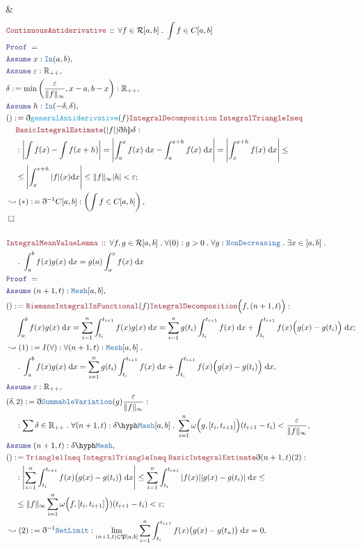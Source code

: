 \documentclass[12pt]{scrartcl}
\newcommand{\TYPE}[1]{\textcolor{NavyBlue}{\mathtt{#1}}}
\newcommand{\FUNC}[1]{\textcolor{Cerulean}{\mathtt{#1}}}
\newcommand{\LOGIC}[1]{\textcolor{Blue}{\mathtt{#1}}}
\newcommand{\THM}[1]{\textcolor{Maroon}{\mathtt{#1}}}
\renewcommand{\.}{\; . \;}
\newcommand{\de}{: \kern 0.1pc =}
\newcommand{\Theorem}[2]{& \THM{#1} \, :: \, #2 \\ & \Proof = \\ }
\newcommand{\NewLine}{\\ & \kern 1pc}
\newcommand{\Page}[1]{ \begin{align*} #1 \end{align*}   }
\newcommand{ \bd }{ \ByDef }
\newcommand{\Reals}{\mathbb{R} }
\newcommand{\Say}[3]{& #1 \de #2 : #3, \\}
\newcommand{\Conclude}[3]{& #1 \de #2 : #3; \\}
\newcommand{\Derive}[3]{& \leadsto #1 \de #2 : #3, \\}
\newcommand{\Assume}[2]{& \LOGIC{Assume} \;#1 : #2, \\}
\newcommand{\QED}{\; \square}
\newcommand{\EndProof}{& \QED \\}
\newcommand{\ByDef}{\eth}
\newcommand{\ByConstr}{\text{\thorn}}
\newcommand{\Proof}{\LOGIC{Proof} \; }
\begin{document}
{{		}
		\EndProof
}\Page{
	\Theorem{ContinuousAntiderivative}
	{
		\forall f \in \mathcal{R}[a,b] \. \int f \in C[a,b]
	}
	\Assume{x}{\TYPE{In}(a,b)}
	\Assume{\varepsilon}{\Reals_{++}}
	\Say{\delta}{\min\left(\frac{\varepsilon}{\| f \|_\infty}, x - a, b - x \right)}{\Reals_{++}}
	\Assume{h}{\TYPE{In}(-\delta,\delta)}
	\Conclude{()}{
		\bd \FUNC{generalAntiderivative}(f)\THM{IntegralDecomposition} \; \THM{IntegralTriangleIneq}
		\NewLine \THM{BasicIntegralEstimate}(|f |)\bd h \ByConstr \delta
		}
	{ \NewLine : 
	  \left| \int f(x)  - \int f(x + h) \right| = 
	  \left|  
		\int_a^x f(x) \; \mathrm{d}x - \int_a^{x + h} f(x) \; \mathrm{d}x
	  \right|   =
	  \left| \int_{x}^{x + h} f(x) \; \mathrm{d}x  \right| \le 
	  \NewLine \le
	  \left| \int_x^{x + h} |f|(x) \mathrm{d}x \right| \le \|f\|_\infty|h| < \varepsilon
	}
	\Derive{(*)}{ \bd^{-1} C[a,b]  }{\left(  \int f \in C[a,b] \right)}
	\EndProof
	\\
	\Theorem{IntegralMeanValueLemma}{   
		\forall f,g \in \mathcal{R}[a,b] \. \forall
		(0) : g > 0 \. \forall g : \TYPE{NonDecreasing} \. \exists x \in [a,b] \.
		\NewLine \. 
		\int^b_a f(x)g(x) \; \mathrm{d}x = g(a)\int^x_a f(x) \; \mathrm{d}x
	}
	\Assume{(n+1,t)}{\TYPE{Mesh}[a,b]}
	\Conclude{ () }{\THM{RiemannIntegralIsFunctional}(f)\THM{IntegralDecomposition}\Big(f,(n+1,t)\Big)}
	{  
	    \NewLine
	    \int^b_a f(x)g(x) \; \mathrm{d}x  
	    = \sum^n_{i=1} \int^{t_{i+1}}_{t_i} f(x)g(x) \; \mathrm{d}x
	    = \sum^n_{i=1} g(t_i)\int^{t_{i+1}}_{t_i} f(x) \; \mathrm{d}x   
	    + \int^{t_{i+1}}_{t_i} f(x)\Big( g(x) - g(t_i)\Big) \;\mathrm{d}x
	}
	\Derive{(1)}{I(\forall)}{\forall (n+1,t) : \TYPE{Mesh}[a,b] \. \NewLine \. 
	    \int^b_a f(x)g(x) \; \mathrm{d}x = \sum^n_{i=1} g(t_i)\int^{t_{i+1}}_{t_i} f(x) \; \mathrm{d}x   
	    + \int^{t_{i+1}}_{t_i} f(x)\Big( g(x) - g(t_i)\Big) \;\mathrm{d}x	
	}
	\Assume{\varepsilon}{\Reals_{++}}
	\Say{(\delta,2)}{\bd \TYPE{SummableVariation}(g) \frac{\varepsilon}{\|f\|_\infty}}
	{ \NewLine :
		\sum \delta \in \Reals_{++} \. \forall (n+1,t) : \delta\hyph\TYPE{Mash}[a,b] \.  
		\sum^n_{i=1} \omega\Big( g, [t_i,t_{i+1}] \Big)(t_{i+1} - t_i) < \frac{\varepsilon}{\|f\|_\infty}
	}
	\Assume{(n+1,t)}{\delta \hyph \TYPE{Mesh}}
	\Conclude{()}{ \THM{TrianglelIneq} \; \THM{IntegralTriangleIneq} \; \THM{BasicIntegralEstimate}  
		\bd (n+1,t) (2)
		}{ \NewLine :  
			\left| \sum^n_{i=1} \int^{t_{i+1}}_{t_i} f(x)\big(g(x) - g(t_i) \big) \; \mathrm{d}x   \right| \le
			\sum^n_{i=1}   \int^{t_{i+1}}_{t_i} |f(x)|| g(x) - g(t_i)|\; \mathrm{d}x \le 
			\NewLine
			\le \| f \|_\infty \sum^n_{i=1}  \omega\Big( f,[t_i,t_{i+1}] \Big))(t_{i+1} - t_i) < \varepsilon
	}
	\Derive{(2)}{\bd^{-1} \TYPE{NetLimit}}{\lim_{(n+1,t) \in \mathfrak{P}[a,b]}
		\sum^n_{i=1} \int^{t_{i+1}}_{t_i} f(x)\big( g(x) - g(t_u) \big) \; \mathrm{d}x = 0
	}
}
\end{document}
